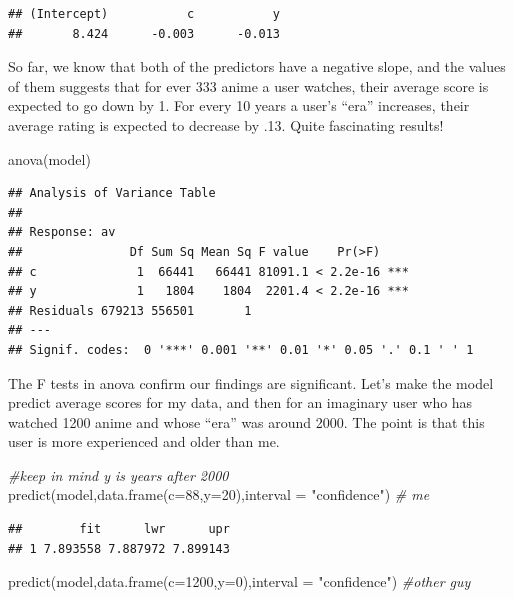\documentclass[
]{article}
\newenvironment{Shaded}{\begin{snugshade}}{\end{snugshade}}
\newcommand{\AttributeTok}[1]{\textcolor[rgb]{0.77,0.63,0.00}{#1}}
\newcommand{\CommentTok}[1]{\textcolor[rgb]{0.56,0.35,0.01}{\textit{#1}}}
\newcommand{\DecValTok}[1]{\textcolor[rgb]{0.00,0.00,0.81}{#1}}
\newcommand{\FunctionTok}[1]{\textcolor[rgb]{0.00,0.00,0.00}{#1}}
\newcommand{\NormalTok}[1]{#1}
\newcommand{\StringTok}[1]{\textcolor[rgb]{0.31,0.60,0.02}{#1}}
\begin{document}
\begin{verbatim}
## (Intercept)           c           y 
##       8.424      -0.003      -0.013
\end{verbatim}

So far, we know that both of the predictors have a negative slope, and
the values of them suggests that for ever 333 anime a user watches,
their average score is expected to go down by 1. For every 10 years a
user's ``era'' increases, their average rating is expected to decrease
by .13. Quite fascinating results!

\begin{Shaded}
\begin{Highlighting}[]
\FunctionTok{anova}\NormalTok{(model)}
\end{Highlighting}
\end{Shaded}

\begin{verbatim}
## Analysis of Variance Table
## 
## Response: av
##               Df Sum Sq Mean Sq F value    Pr(>F)    
## c              1  66441   66441 81091.1 < 2.2e-16 ***
## y              1   1804    1804  2201.4 < 2.2e-16 ***
## Residuals 679213 556501       1                      
## ---
## Signif. codes:  0 '***' 0.001 '**' 0.01 '*' 0.05 '.' 0.1 ' ' 1
\end{verbatim}

The F tests in anova confirm our findings are significant. Let's make
the model predict average scores for my data, and then for an imaginary
user who has watched 1200 anime and whose ``era'' was around 2000. The
point is that this user is more experienced and older than me.

\begin{Shaded}
\begin{Highlighting}[]
\CommentTok{\#keep in mind y is years after 2000}
\FunctionTok{predict}\NormalTok{(model,}\FunctionTok{data.frame}\NormalTok{(}\AttributeTok{c=}\DecValTok{88}\NormalTok{,}\AttributeTok{y=}\DecValTok{20}\NormalTok{),}\AttributeTok{interval =} \StringTok{"confidence"}\NormalTok{) }\CommentTok{\# me}
\end{Highlighting}
\end{Shaded}

\begin{verbatim}
##        fit      lwr      upr
## 1 7.893558 7.887972 7.899143
\end{verbatim}

\begin{Shaded}
\begin{Highlighting}[]
\FunctionTok{predict}\NormalTok{(model,}\FunctionTok{data.frame}\NormalTok{(}\AttributeTok{c=}\DecValTok{1200}\NormalTok{,}\AttributeTok{y=}\DecValTok{0}\NormalTok{),}\AttributeTok{interval =} \StringTok{"confidence"}\NormalTok{) }\CommentTok{\#other guy}
\end{Highlighting}
\end{Shaded}
\end{document}
